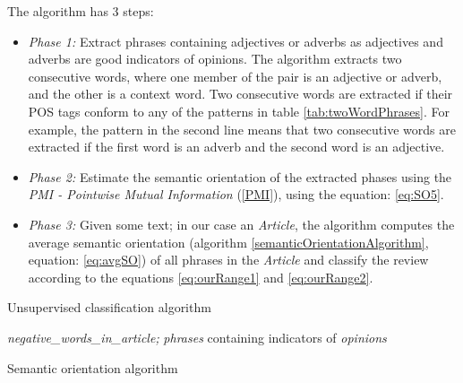 The algorithm has 3 steps:
	\begin{itemize}
		\item \emph{Phase 1:} Extract phrases containing adjectives or adverbs as adjectives and adverbs are good indicators of opinions. The algorithm extracts two consecutive words, where one member of the pair is an adjective or adverb, and the other is a context word. Two consecutive words are extracted if their POS tags conform to any of the patterns in table \ref{tab:twoWordPhrases}. For example, the pattern in the second line means that two consecutive words are extracted if the first word is an adverb and the second word is an adjective.
		\item \emph{Phase 2:} Estimate the semantic orientation of the extracted phases using the \emph{PMI - Pointwise Mutual Information} (\ref{PMI}), using the equation: \ref{eq:SO5}. 
		\item \emph{Phase 3:} Given some text; in our case an \emph{Article}, the algorithm computes the average semantic orientation (algorithm \ref{semanticOrientationAlgorithm}, equation: \ref{eq:avgSO}) of all phrases in the \emph{Article} and classify the review according to the equations  \ref{eq:ourRange1} and \ref{eq:ourRange2}.
	\end{itemize}

\begin{algorithm}
\caption{Unsupervised classification algorithm}\label{unsupervisedAlgorithm}
\begin{algorithmic}[1]
\STATE {}
\STATE {}
\STATE {}
\STATE {}

\STATE {} \emph{negative\_words\_in\_article;}
\STATE {}
\STATE {} \emph{phrases} containing indicators of \emph{opinions}
\STATE {}
	\STATE {}
\ENDFOR
\STATE {}
\STATE {}
\STATE {}
\end{algorithmic}
\end{algorithm}

\begin{algorithm}
\caption{Semantic orientation algorithm}\label{semanticOrientationAlgorithm}
\begin{algorithmic}[1]
\STATE {}
\STATE {}
	\STATE {}
	\STATE {}
	\ENDIF
	\STATE {}
	\STATE {}
	\ENDIF
\ENDFOR
\RETURN {}
\end{algorithmic}
\end{algorithm}


